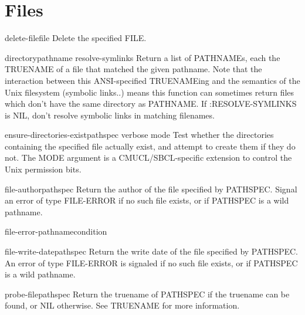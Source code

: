 \section{Files}

\begin{function}{delete-file}{file}{}{}
  Delete the specified FILE.
\end{function}

\begin{function}{directory}{pathname \key resolve-symlinks}{}{}
  Return a list of PATHNAMEs, each the TRUENAME of a file that matched the
   given pathname. Note that the interaction between this ANSI-specified
   TRUENAMEing and the semantics of the Unix filesystem (symbolic links..)
   means this function can sometimes return files which don't have the same
   directory as PATHNAME.  If :RESOLVE-SYMLINKS is NIL, don't resolve
   symbolic links in matching filenames.
\end{function}

\begin{function}{ensure-directories-exist}{pathspec \key verbose mode}{}{}
  Test whether the directories containing the specified file
  actually exist, and attempt to create them if they do not.
  The MODE argument is a CMUCL/SBCL-specific extension to control
  the Unix permission bits.
\end{function}

\begin{function}{file-author}{pathspec}{}{}
  Return the author of the file specified by PATHSPEC. Signal an
error of type FILE-ERROR if no such file exists, or if PATHSPEC
is a wild pathname.
\end{function}

\begin{function}{file-error-pathname}{condition}{}{}
  
\end{function}

\begin{function}{file-write-date}{pathspec}{}{}
  Return the write date of the file specified by PATHSPEC.
An error of type FILE-ERROR is signaled if no such file exists,
or if PATHSPEC is a wild pathname.
\end{function}

\begin{function}{probe-file}{pathspec}{}{}
  Return the truename of PATHSPEC if the truename can be found,
or NIL otherwise.  See TRUENAME for more information.
\end{function}


